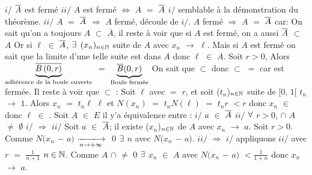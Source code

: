 \documentclass{article}
\begin{document}
\propositions $i/$ $\overline{A}$ est fermé \smallbreak
$ii/$ $A$ est fermé $\Longleftrightarrow$ $A$ $=$ $\overline{A}$
\demo $i/$ semblable à la démonstration du théorème.
\s
$ii/$ $A$ $=$ $\overline{A}$ $\Longrightarrow$ $A$ fermé,  découle de $i/$.
\s $A$ fermé $\Longrightarrow$ $A$ $=$ $\overline{A}$ car: On sait qu'on a toujours $A$ $\subset$ $\overline{A}$, il reste à voir que si $A$ est fermé, on a aussi $\overline{A}$ $\subset$ $A$ \s Or si $\ell$ $\in$ $\overline{A}$, $\exists$ $(x_n)_{n \in \mathbb{N}}$ suite de $A$ avec $x_n$ $\longrightarrow$ $\ell$.
Mais si $A$ est fermé on sait que la limite d'une telle suite \s est dans $A$ donc $\ell$ $\in$ $A$.
\ex Soit $r>0$, Alors $\underset{\text{adhérence de la boule ouverte}}{\underbrace{\text{$\overline{\mbox{$B\left( 0, r \right)$}}$}}}$ $=$ $\underset{\text{Boule fermée}}{\underbrace{\text{$\overline{B}$$\left(0, r\right)$}}}$
\demo
On sait que  $\subset$  donc  $\subset$  $=$  car  est fermée. \s Il reste à voir que  $\subset$ : Soit $\ell$ avec \Nor{\ell} $=$ $r$, et soit ($t_n$)$_{n \in \mathbb{N}}$ suite de [$0$, $1$[ $t_n$ $\longrightarrow$ $1$. \s Alors $x_n$ $=$ $t_n \ell$ \tendplusinf $ \ell$ et $N(x_n)$ $=$ $t_n N(\ell)$ $=$ $t_n r$ $<r$ donc $x_n$ $\in$  donc $\ell$ $\in$ .
\proposition Soit $A$ $\in$ $E$ il y’a équivalence entre : \s
$i/$ $a$ $\in$ $\overline{A}$ \s
$ii/$ $\forall$ $r>0$,  $\cap$ $A$ $\neq$ $\emptyset$ \s
\demo
$i/$ $\Longrightarrow$ $ii/$ Soit $a$ $\in$ $\overline{A}$; il existe ($x_n$)$_{n \in \mathbb{N}}$ de $A$ avec $x_n$ $\longrightarrow$ $a$.
Soit $r>0$. Comme $N(x_n$ $-$ $a)$ $\tendplusinf$ $0$ \s $\exists$ $n$ avec $N(x_n$ $-$ $a)$. \s
$ii/$ $\Longrightarrow$ $i/$ appliquons $ii/$ avec $r$ $=$ $\frac{1}{n+1}$  $n \in \mathbb{N}$. Comme $A$ $\cap$  $\neq$ $0$ $\exists$ $x_n$ $\in$ $A$ avec $N(x_n$ $-$ $a)$ $<\frac{1}{1+n}$ \s donc $x_n$ $\longrightarrow$ $a$.
\end{document}
